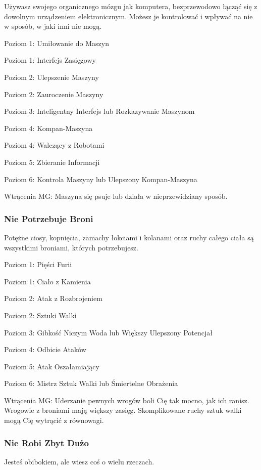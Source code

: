 Używasz swojego organicznego mózgu jak komputera, bezprzewodowo łącząć się z dowolnym urządzeniem elektronicznym. Możesz je kontrolować i wpływać na nie w sposób, w jaki inni nie mogą. 

Poziom 1: Umiłowanie do Maszyn

Poziom 1: Interfejs Zasięgowy

Poziom 2: Ulepszenie Maszyny

Poziom 2: Zauroczenie Maszyny

Poziom 3: Inteligentny Interfejs lub Rozkazywanie Maszynom

Poziom 4: Kompan-Maszyna

Poziom 4: Walczący z Robotami

Poziom 5: Zbieranie Informacji

Poziom 6: Kontrola Maszyny lub Ulepszony Kompan-Maszyna

Wtrącenia MG: Maszyna się psuje lub działa w nieprzewidziany sposób.

\subsubsection{Nie Potrzebuje Broni}

Potężne ciosy, kopnięcia, zamachy łokciami i kolanami oraz ruchy całego ciała są wszystkimi broniami, których potrzebujesz. 

Poziom 1: Pięści Furii

Poziom 1: Ciało z Kamienia

Poziom 2: Atak z Rozbrojeniem

Poziom 2: Sztuki Walki

Poziom 3: Gibkość Niczym Woda lub Większy Ulepszony Potencjał

Poziom 4: Odbicie Ataków

Poziom 5: Atak Oszałamiający

Poziom 6: Mistrz Sztuk Walki lub Śmiertelne Obrażenia

Wtrącenia MG: Uderzanie pewnych wrogów boli Cię tak mocno, jak ich ranisz. Wrogowie z broniami mają większy zasięg. Skomplikowane ruchy sztuk walki mogą Cię wytrącić z równowagi.

\subsubsection{Nie Robi Zbyt Dużo}

Jesteś obibokiem, ale wiesz coś o wielu rzeczach. 

